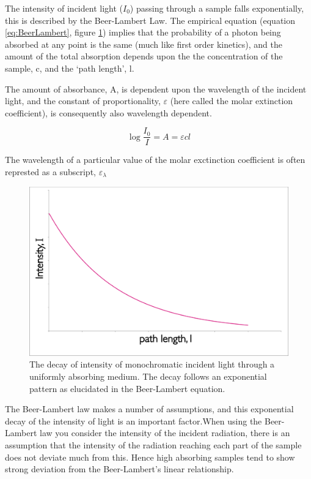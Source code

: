 \documentclass[
]{book}
\begin{document}
The intensity of incident light (\(I_0\)) passing through a sample falls exponentially, this is described by the Beer-Lambert Law. The empirical equation (equation \eqref{eq:BeerLambert}, figure \ref{fig:BeerLambert}) implies that the probability of a photon being absorbed at any point is the same (much like first order kinetics), and the amount of the total absorption depends upon the the concentration of the sample, c, and the `path length', l.

The amount of absorbance, A, is dependent upon the wavelength of the incident light, and the constant of proportionality, \(\varepsilon\) (here called the molar extinction coefficient), is consequently also wavelength dependent.

\begin{equation}
\log \frac{I_0}{I}=A=\varepsilon cl
\label{eq:BeerLambert}
\end{equation}

The wavelength of a particular value of the molar exctinction coefficient is often represted as a subscript, \(\varepsilon _\lambda\)

\begin{figure}

{\centering \includegraphics[width=0.5\linewidth]{images/BeerLambert} 

}

\caption{The decay of intensity of monochromatic incident light through a uniformly absorbing medium. The decay follows an exponential pattern as elucidated in the Beer-Lambert equation.}\label{fig:BeerLambert}
\end{figure}

The Beer-Lambert law makes a number of assumptions, and this exponential decay of the intensity of light is an important factor.When using the Beer-Lambert law you consider the intensity of the incident radiation, there is an assumption that the intensity of the radiation reaching each part of the sample does not deviate much from this. Hence high absorbing samples tend to show strong deviation from the Beer-Lambert's linear relationship.
\end{document}
